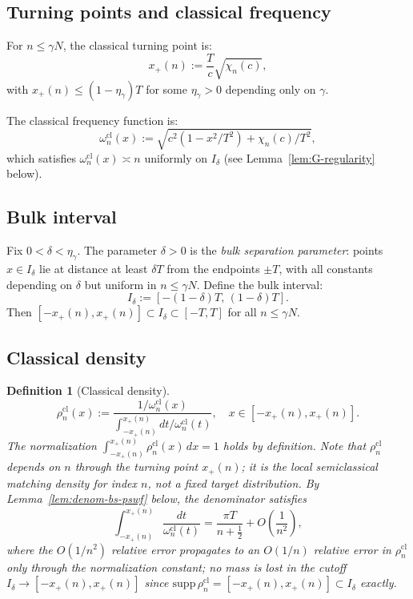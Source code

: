\documentclass[12pt,a4paper]{amsart}
\newtheorem{definition}[theorem]{Definition}
\newcommand{\wncl}{\omega_n^{\mathrm{cl}}}
\newcommand{\rhocl}{\rho^{\mathrm{cl}}}
\begin{document}
\subsection{Turning points and classical frequency}

For $n \le \gamma N$, the classical turning point is:
\begin{equation}\label{eq:turning-point}
  x_+(n) := \frac{T}{c}\sqrt{\chi_n(c)},
\end{equation}
with $x_+(n) \le (1-\eta_\gamma)T$ for some $\eta_\gamma > 0$
depending only on $\gamma$.

The classical frequency function is:
\begin{equation}\label{eq:wncl-def}
  \wncl(x) := \sqrt{c^2(1 - x^2/T^2) + \chi_n(c)/T^2},
\end{equation}
which satisfies $\wncl(x) \asymp n$ uniformly on $I_\delta$
(see Lemma~\ref{lem:G-regularity} below).

\subsection{Bulk interval}

Fix $0 < \delta < \eta_\gamma$. The parameter $\delta > 0$ is the
\emph{bulk separation parameter}: points $x \in I_\delta$ lie at
distance at least $\delta T$ from the endpoints $\pm T$, with all
constants depending on $\delta$ but uniform in $n \le \gamma N$.
Define the bulk interval:
\begin{equation}\label{eq:Idelta}
  I_\delta := [-(1-\delta)T,\,(1-\delta)T].
\end{equation}
Then $[-x_+(n), x_+(n)] \subset I_\delta \subset [-T,T]$
for all $n \le \gamma N$.

\subsection{Classical density}

\begin{definition}[Classical density]\label{def:rho-cl}
\begin{equation}\label{eq:rho-cl}
  \rhocl_n(x) :=
  \frac{1/\wncl(x)}{\int_{-x_+(n)}^{x_+(n)} dt/\wncl(t)},
  \quad x \in [-x_+(n), x_+(n)].
\end{equation}
The normalization $\int_{-x_+(n)}^{x_+(n)}\rhocl_n(x)\,dx = 1$
holds by definition.
Note that $\rhocl_n$ depends on $n$ through the turning point
$x_+(n)$; it is the \emph{local semiclassical matching density}
for index $n$, not a fixed target distribution.
By Lemma~\ref{lem:denom-bs-pswf} below,
the denominator satisfies
\begin{equation}\label{eq:denom-BS}
  \int_{-x_+(n)}^{x_+(n)}\frac{dt}{\wncl(t)}
  = \frac{\pi T}{n + \tfrac{1}{2}} + O\!\left(\frac{1}{n^2}\right),
\end{equation}
where the $O(1/n^2)$ relative error propagates
to an $O(1/n)$ relative error in $\rhocl_n$ only through the
normalization constant; no mass is lost in the cutoff
$I_\delta \to [-x_+(n),x_+(n)]$ since
$\mathrm{supp}\,\rhocl_n = [-x_+(n),x_+(n)] \subset I_\delta$
exactly.
\end{definition}
\end{document}
